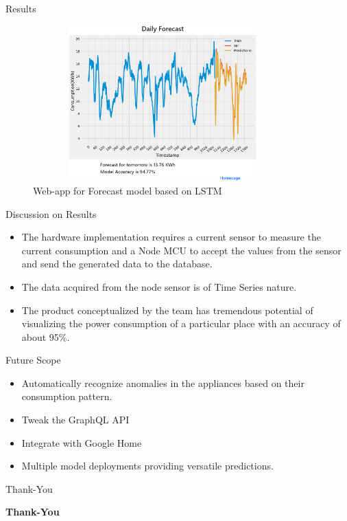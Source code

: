 \documentclass[11pt, aspect ratio=169]{beamer}
\begin{document}
\begin{frame}{Results}
         \begin{figure}[H]%
            \begin {center}
            \includegraphics[width=10cm,height=6cm]{images/results.png}
            \caption{Web-app for Forecast model based on LSTM}
            \end {center}
            \end{figure}
\end{frame}


\begin{frame}{Discussion on Results}
\begin{itemize}
    \item The hardware implementation requires a current sensor to measure the current consumption and a Node MCU to accept the values from the sensor and send the generated data to the database.
    \item The data acquired from the node sensor is of Time Series nature.
    \item The product conceptualized by the team has tremendous potential of visualizing the power consumption  of a particular place with an accuracy of about 95\%.
\end{itemize}
 
\end{frame}


\begin{frame}{Future Scope}
 \begin{itemize}

  \item Automatically recognize anomalies in the appliances based on their consumption pattern. 
  \item Tweak the GraphQL API 
 \item Integrate with Google Home 
 \item Multiple model deployments providing versatile predictions.
 \end{itemize}
 \end{frame}

\begin{frame}{Thank-You}
\begin{center}
\begin{large}
\textbf{Thank-You}
\end{large}
\end{center}
\end{frame}
\end{document}
